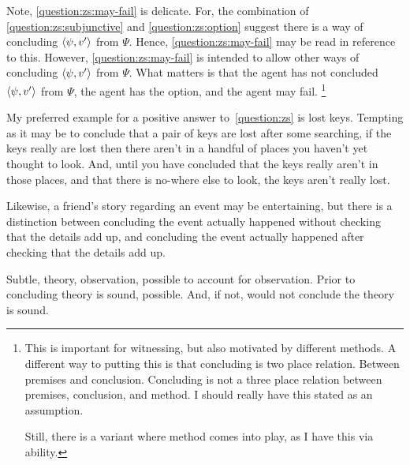   {
    \color{red}
    Note, \ref{question:zs:may-fail} is delicate.
    For, the combination of \ref{question:zs:subjunctive} and \ref{question:zs:option} suggest there is a way of concluding \(\langle \psi, v' \rangle\) from \(\Psi\).
    Hence, \ref{question:zs:may-fail} may be read in reference to this.
    However, \ref{question:zs:may-fail} is intended to allow other ways of concluding \(\langle \psi, v' \rangle\) from \(\Psi\).
    What matters is that the agent has not concluded \(\langle \psi, v' \rangle\) from \(\Psi\), the agent has the option, and the agent may fail.%
    \footnote{
      This is important for witnessing, but also motivated by different methods.
      A different way to putting this is that concluding is two place relation.
      Between premises and conclusion.
      Concluding is not a three place relation between premises, conclusion, and method.
      I should really have this stated as an assumption.

      Still, there is a variant where method comes into play, as I have this via ability.
    }
  }

\begin{note}
  My preferred example for a positive answer to~\ref{question:zs} is lost keys.
  Tempting as it may be to conclude that a pair of keys are lost after some searching, if the keys really are lost then there aren't in a handful of places you haven't yet thought to look.
  And, until you have concluded that the keys really aren't in those places, and that there is no-where else to look, the keys aren't really lost.

  Likewise, a friend's story regarding an event may be entertaining, but there is a distinction between concluding the event actually happened without checking that the details add up, and concluding the event actually happened after checking that the details add up.

  Subtle, theory, observation, possible to account for observation.
  Prior to concluding theory is sound, possible.
  And, if not, would not conclude the theory is sound.
\end{note}

